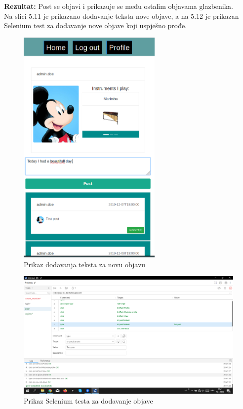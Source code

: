 			\noindent\textbf{Rezultat:} Post se objavi i prikazuje se među ostalim objavama glazbenika.\\
			
			Na slici 5.11 je prikazano dodavanje teksta nove objave, a na 5.12 je prikazan Selenium test za dodavanje nove objave koji uspješno prođe. 
			
			\begin{figure}[H]
				\begin{center}
					\includegraphics[width=7cm]{slike/post.PNG}
				\end{center}
				\caption{Prikaz dodavanja teksta za novu objavu}
				\label{fig:post}
			\end{figure}
		
			\begin{figure}[H]
				\begin{center}
					\includegraphics[width=15cm]{slike/selpost.PNG}
				\end{center}
				\caption{Prikaz Selenium testa za dodavanje objave}
				\label{fig:selpost}
			\end{figure}
			
